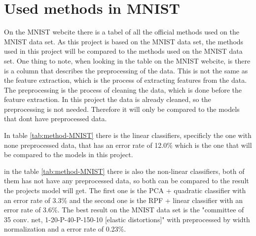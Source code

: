 \section{Used methods in MNIST}
On the MNIST webcite \cite{MNIST} there is a tabel of all the official methods used on the MNIST data set. As this project is based on the MNIST data set, the methods used in this project will be compared to the methods used on the MNIST data set. One thing to note, when looking in the table on the MNIST webcite, is there is a column that describes the preprocessing of the data. 
This is not the same as the feature extraction, which is the process of extracting features from the data. The preprocessing is the process of cleaning the data, which is done before the feature extraction. In this project the data is already cleaned, so the preprocessing is not needed. Therefore it will only be compared to the models that dont have preprocessed data. 

In table \ref{tab:method-MNIST} there is the linear classifiers, specificly the one with none preprocessed data, that has an error rate of 12.0\% which is the one that will be compared to the models in this project. 

in the table \ref{tab:method-MNIST} there is also the non-linear classifiers, both of them has not have any preprocessed data, so both can be compared to the result the projects model will get. The first one is the PCA + quadratic classifier with an error rate of 3.3\% and the second one is the RPF + linear classifier with an error rate of 3.6\%. The best result on the MNIST data set is the "committee of 35 conv. net, 1-20-P-40-P-150-10 [elastic distortions]" with preprocessed by width normalization and a error rate of 0.23\%.

